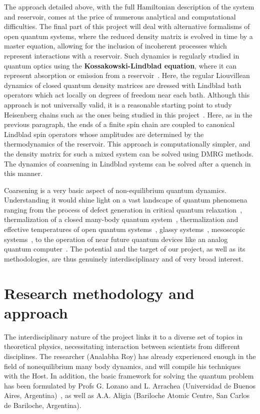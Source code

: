 \documentclass[a4paper,11pt,color]{article}
\begin{document}
The approach detailed above, with the full Hamiltonian description of the system and reservoir, comes at the price of numerous analytical and computational difficulties. The final part of this project will deal with alternative formalisms of open quantum systems, where the reduced density matrix is evolved in time by a master equation, allowing for the inclusion of incoherent processes which represent interactions with a reservoir. Such dynamics is regularly studied in quantum optics using the \textbf{Kossakowski-Lindblad equation}, where it can represent absorption or emission from a reservoir~\cite{lindblad}. Here, the regular Liouvillean dynamics of closed quantum density matrices are dressed with Lindblad bath operators which act locally on degrees of freedom near each bath. Although this approach is not universally valid, it is a reasonable starting point to study Heisenberg chains such as the ones being studied in this project~\cite{spinchains:lindblad}. Here, as in the previous paragraph, the ends of 
a finite spin chain are coupled to canonical Lindblad spin operators whose amplitudes are determined by the thermodynamics of the reservoir.  This approach is computationally simpler, and the density matrix for such a mixed system can be solved using DMRG methods. The dynamics of coarsening in Lindblad systems can be solved after a quench in this manner.

Coarsening is a very basic aspect of non-equilibrium quantum dynamics. Understanding it would shine light on a vast landscape of quantum phenomena ranging from the process of defect generation in critical quantum relaxation~\cite{relaxation}, thermalization of a closed many-body quantum system~\cite{krishrev, thermalization}, thermalization and effective temperatures of open quantum systems~\cite{thermopen}, glassy systems~\cite{glassy}, mesoscopic systems~\cite{meso}, to the operation of near future quantum devices like an analog quantum computer~\cite{annealing}. The potential and the target of our project, as well as its methodologies, are thus genuinely interdisciplinary and of very broad interest.
 
\section{Research methodology and approach}
\label{sec:research_methodology}

The interdisciplinary nature of the project links it to  a diverse set of topics in theoretical physics, necessitating interaction between scientists from different disciplines. The researcher (Analabha Roy) has already experienced enough in the field of nonequilibrium many body dynamics, and will compile his techniques with the Host. In addition, the basic framework for solving the quantum problem has been formulated by Profs G. Lozano and L. Arrachea (Universidad de Buenos Aires, Argentina)~\cite{arrachea, arrachea2}, as well as A.A. Aligia (Bariloche Atomic Centre, San Carlos de Bariloche, Argentina). 
\end{document}

